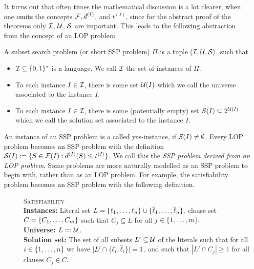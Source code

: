 It turns out that often times the mathematical discussion is a lot clearer, when one omits the concepts $\mathcal{F}, d^{(I)}$, and $t^{(I)}$, since for the abstract proof of the theorems only $\mathcal{I}$, $\mathcal{U}$, $\mathcal{S}$ are important.
This leads to the following abstraction from the concept of an LOP problem:

\begin{definition}
\label{def:SSP}
A subset search problem (or short SSP problem) $\Pi$ is a tuple $(\mathcal{I}, \mathcal{U}, \mathcal{S})$, such that
\begin{itemize}
    \item $\mathcal{I} \subseteq \{ 0,1 \}^*$ is a language. We call $\mathcal{I}$ the set of instances of $\Pi$. 
    \item To each instance $I \in \mathcal{I}$, there is some set $\mathcal{U}(I)$ which we call the universe associated to the instance $I$. 
    \item To each instance $I \in \mathcal{I}$, there is some (potentially empty) set $\mathcal{S}(I)\subseteq 2^{\mathcal{U}(I)}$ which we call the solution set associated to the instance $I$.
\end{itemize}
\end{definition}

An instance of an SSP problem is a called yes-instance, if $\mathcal{S}(I) \neq \emptyset$. 
Every LOP problem becomes an SSP problem with the definition $\mathcal{S}(I) := \{ S \in \mathcal{F}(I) : d^{(I)}(S) \leq t^{(I)} \}$.
We call this the \emph{SSP problem derived from an LOP problem}. Some problems are more naturally modelled as an SSP problem to begin with, rather than as an LOP problem.
For example, the satisfiability problem becomes an SSP problem with the following definition.

\begin{description}
    \item[]\textsc{Satisfiability}\hfill\\
    \textbf{Instances:} Literal set $L = \{ \ell_1, \ldots, \ell_n \} \cup \{ \overline \ell_1, \ldots, \overline \ell_n \}$, clause set $C = \{ C_1, \ldots, C_m \}$ such that $C_j \subseteq L$ for all $j \in \{ 1, \ldots, m \}.$\\
    \textbf{Universe:} $L =: \mathcal{U}$.\\
    \textbf{Solution set:} The set of all subsets $L' \subseteq \mathcal{U}$ of the literals such that for all $i \in \{ 1, \ldots, n \}$ we have $|L' \cap \{ \ell_i, \overline \ell_i \}| = 1$, and such that $|L' \cap C_j| \geq 1$ for all clauses $C_j \in C$.
\end{description}

